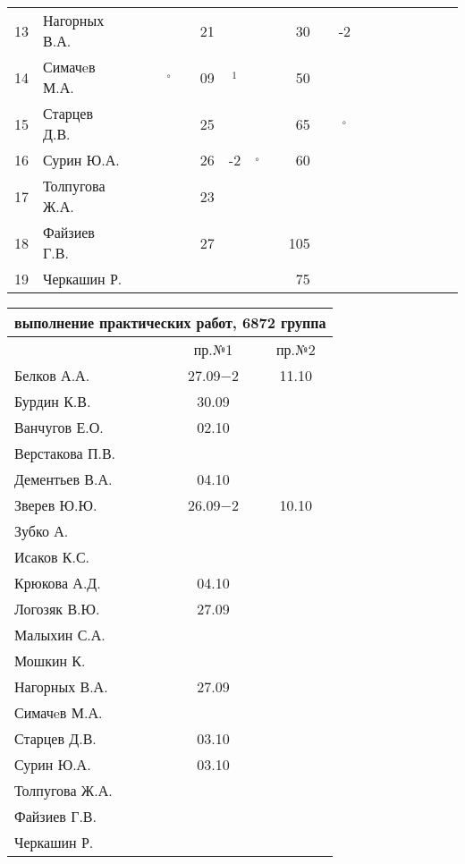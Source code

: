 \documentclass[a4paper,11pt]{article}
\newcommand*\OK{&\small \ding{51}$\!\!_\circ$} %
\newcommand*\Ok{&\small \ding{51}$\!\!_\circ$} %
\newcommand*\ok{&{\small\ding{51}}} %
\newcommand*\no{&{\small }} %
\newcommand*\da{&{\small\ding{48}$\!\!_1$}} %
\begin{document}
\begin{tabular}{l|l|ccccccccrccccccccc}
13& Нагорных В.А.    \ok\ok\ok\ok&21\ok\ok\ok& 30\ok&-2\ok&&&&&\\
14& Симачeв М.А.     \ok\ok\OK\ok&09\da\no\no& 50\no\no\no&&&&&\\
15& Старцев Д.В.     \ok\ok\ok\ok&25\ok\ok\ok& 65\ok\Ok\ok&&&&&\\
16& Сурин Ю.А.       \ok\ok\ok\ok&26&-2\OK\ok& 60\ok\ok\ok&&&&&\\
17& Толпугова Ж.А.   \no\no\no\no&23\ok\no\no \no\no\no\no&&&&&\\
18& Файзиев Г.В.     \ok\ok\ok\ok&27\ok\ok\ok&105\ok\ok\ok&&&&&\\
19& Черкашин Р.      \ok\ok\ok\ok\no\no\no\no& 75\no\ok\ok&&&&&\\ 
\bottomrule
\end{tabular} 

\newpage
\begin{tabular}{l|cc}
\multicolumn{3}{c}{выполнение практических работ, 6872 группа} \\
\toprule
& пр.№1 & пр.№2 \\
\midrule
Белков А.А.    &27.09$-2$&11.10\\   
Бурдин К.В.    &30.09    &     \\
Ванчугов Е.О.  &02.10    &     \\
Верстакова П.В.&         &     \\
Дементьев В.А. &04.10    &     \\
Зверев Ю.Ю.    &26.09$-2$&10.10\\
Зубко А.       &         &     \\
Исаков К.С.    &         &     \\
Крюкова А.Д.   &04.10    &     \\
Логозяк В.Ю.   &27.09    &     \\
Малыхин С.А.   &         &     \\
Мошкин К.      &         &     \\
Нагорных В.А.  &27.09    &     \\
Симачeв М.А.   &         &     \\
Старцев Д.В.   &03.10    &     \\
Сурин Ю.А.     &03.10    &     \\
Толпугова Ж.А. &         &     \\
Файзиев Г.В.   &         &     \\
Черкашин Р.    &         &     \\
\bottomrule
\end{tabular}
\end{document}
